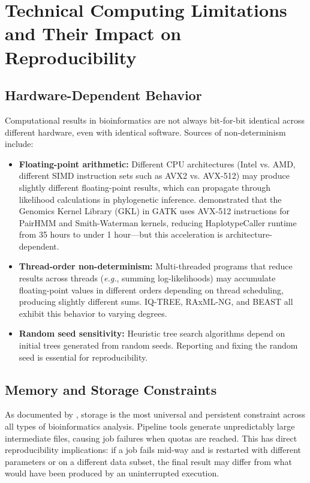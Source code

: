 \section{Technical Computing Limitations and Their Impact on Reproducibility}

\subsection{Hardware-Dependent Behavior}

Computational results in bioinformatics are not always bit-for-bit identical across different hardware, even with identical software. Sources of non-determinism include:

\begin{itemize}
\item \textbf{Floating-point arithmetic:} Different CPU architectures (Intel vs. AMD, different SIMD instruction sets such as AVX2 vs. AVX-512) may produce slightly different floating-point results, which can propagate through likelihood calculations in phylogenetic inference. \textcite{powers2022} demonstrated that the Genomics Kernel Library (GKL) in GATK uses AVX-512 instructions for PairHMM and Smith-Waterman kernels, reducing HaplotypeCaller runtime from 35 hours to under 1 hour---but this acceleration is architecture-dependent.

\item \textbf{Thread-order non-determinism:} Multi-threaded programs that reduce results across threads (\textit{e.g.}, summing log-likelihoods) may accumulate floating-point values in different orders depending on thread scheduling, producing slightly different sums. IQ-TREE, RAxML-NG, and BEAST all exhibit this behavior to varying degrees.

\item \textbf{Random seed sensitivity:} Heuristic tree search algorithms depend on initial trees generated from random seeds. Reporting and fixing the random seed is essential for reproducibility.
\end{itemize}

\subsection{Memory and Storage Constraints}

As documented by \textcite{zafeiropoulos2021}, storage is the most universal and persistent constraint across all types of bioinformatics analysis. Pipeline tools generate unpredictably large intermediate files, causing job failures when quotas are reached. This has direct reproducibility implications: if a job fails mid-way and is restarted with different parameters or on a different data subset, the final result may differ from what would have been produced by an uninterrupted execution.

